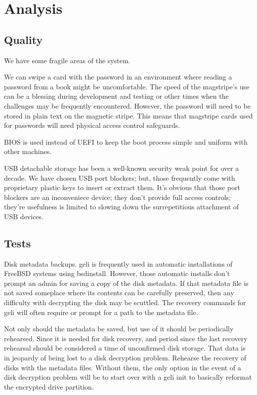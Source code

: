 \section{Analysis}
\subsection{Quality}
We have some fragile areas of the system.

We can swipe a card with the \gls{password} in an environment where reading a \gls{password} from a book might be uncomfortable.  The speed of the magstripe's use can be a blessing during development and testing or other times when the challenges may be frequently encountered.  However, the \gls{password} will need to be stored in plain text on the magnetic stripe.  This means that magstripe cards used for passwords will need physical access control safeguards.

BIOS is used instead of UEFI to keep the boot process simple and uniform with other machines.

USB detachable storage has been a well-known security weak point for over a decade.  We have chosen USB \gls{port} blockers; but, those frequently come with proprietary plastic keys to insert or extract them.  It's obvious that those \gls{port} blockers are an inconveniece device; they don't provide full access controls; they're usefulness is limited to slowing down the surrepetitious attachment of USB devices.

\subsection{Tests}
Disk \gls{metadata} backups.  geli is frequently used in automatic installations of FreeBSD systems using bsdinstall.  However, those automatic installs don't prompt an admin for saving a copy of the disk \gls{metadata}.  If that \gls{metadata} file is not saved someplace where its contents can be carefully preserved, then any difficulty with decrypting the disk may be scuttled.  The recovery commands for geli will often require or prompt for a path to the \gls{metadata} file.

Not only should the \gls{metadata} be saved, but use of it should be periodically rehearsed.  Since it is needed for disk recovery, and period since the last recovery rehearsal should be considered a time of unconfirmed disk storage.  That data is in jeopardy of being lost to a disk \gls{decryption} problem.  Rehearse the recovery of disks with the \gls{metadata} files.  Without them, the only option in the event of a disk \gls{decryption} problem will be to start over with a geli init to basically reformat the encrypted drive \gls{partition}.

